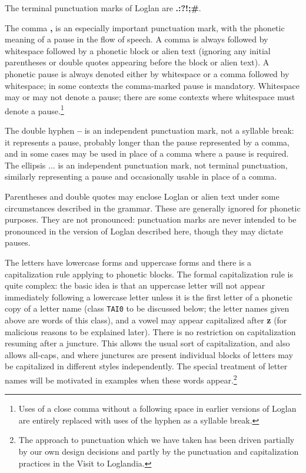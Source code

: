 \documentclass[12pt]{book}
\begin{document}
The terminal punctuation marks of Loglan are {\bf .:?!;\#}.  

The comma {\bf ,} is an especially important punctuation mark, with the phonetic meaning of a pause in the flow of speech.  A comma is always followed by whitespace followed by a phonetic block or alien text (ignoring any initial parentheses or double quotes appearing before the block or alien text).
A phonetic pause is always denoted either by whitespace or a comma followed by whitespace;  in some contexts the comma-marked pause is mandatory.  Whitespace may or may not denote a pause;  there are some contexts where whitespace must denote a pause.\footnote{Uses of a close comma without a following space in earlier versions of Loglan are entirely replaced with uses of the hyphen as a syllable break.}

The double hyphen {\bf --} is an independent punctuation mark, not a syllable break:  it represents a pause, probably longer than the pause represented by a comma, and in some cases may be used in place of a comma where a pause is required.  The ellipsis $\ldots$ is an independent punctuation mark, not terminal punctuation, similarly representing a pause and occasionally usable in place of a comma.

Parentheses and double quotes may enclose Loglan or alien text  under some circumstances described in the grammar.  These are generally ignored for phonetic purposes.  They are not pronounced:  punctuation marks are never intended to be pronounced in the version of Loglan described here, though they may dictate pauses.

The letters have lowercase forms and uppercase forms and there is a capitalization rule applying to phonetic blocks.  The formal capitalization rule is quite complex:  the basic idea is that an uppercase letter will not appear immediately following a lowercase letter unless it is the first letter of a phonetic copy of a letter name (class {\tt TAI0} to be discussed below; the letter names given above are words of this class), and a vowel may appear capitalized after {\bf z} (for malicious reasons to be explained later).    There is no restriction on capitalization resuming after a juncture.  This allows the usual sort of capitalization, and also allows all-caps, and where junctures are present individual blocks of letters may be capitalized in different styles independently.
The special treatment of letter names will be motivated in examples when these words appear.\footnote{The approach to punctuation which we have taken has been driven partially by our own design decisions and partly by the punctuation and capitalization practices in the Visit to Loglandia.}
\end{document}
